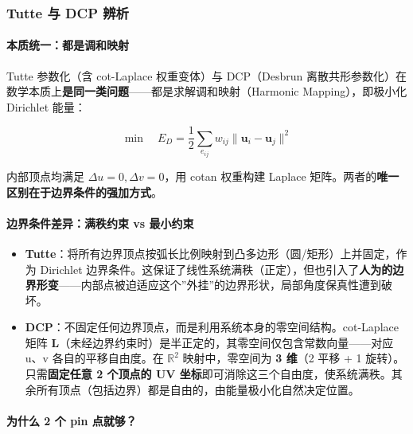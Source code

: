 \documentclass[
]{article}
\begin{document}
\subsubsection{Tutte 与 DCP 辨析}\label{tutte-ux4e0e-dcp-ux8fa8ux6790}

\paragraph{本质统一：都是调和映射}\label{ux672cux8d28ux7edfux4e00ux90fdux662fux8c03ux548cux6620ux5c04}

Tutte 参数化（含 cot-Laplace 权重变体）与 DCP（Desbrun
离散共形参数化）在数学本质上\textbf{是同一类问题}------都是求解调和映射（Harmonic
Mapping），即极小化 Dirichlet 能量：

\[
\min \quad E_D = \frac{1}{2} \sum_{e_{ij}} w_{ij} \|\mathbf{u}_i - \mathbf{u}_j\|^2
\]

内部顶点均满足 \(\Delta u = 0, \Delta v = 0\)，用 cotan 权重构建 Laplace
矩阵。两者的\textbf{唯一区别在于边界条件的强加方式}。

\paragraph{边界条件差异：满秩约束 vs
最小约束}\label{ux8fb9ux754cux6761ux4ef6ux5deeux5f02ux6ee1ux79e9ux7ea6ux675f-vs-ux6700ux5c0fux7ea6ux675f}

\begin{itemize}
\item
  \textbf{Tutte}：将所有边界顶点按弧长比例映射到凸多边形（圆/矩形）上并固定，作为
  Dirichlet
  边界条件。这保证了线性系统满秩（正定），但也引入了\textbf{人为的边界形变}------内部点被迫适应这个''外挂''的边界形状，局部角度保真性遭到破坏。
\item
  \textbf{DCP}：不固定任何边界顶点，而是利用系统本身的零空间结构。cot-Laplace
  矩阵
  \(\mathbf{L}\)（未经边界约束时）是半正定的，其零空间仅包含常数向量------对应
  u、v 各自的平移自由度。在 \(\mathbb{R}^2\) 映射中，零空间为 \textbf{3
  维}（2 平移 + 1 旋转）。只需\textbf{固定任意 2 个顶点的 UV
  坐标}即可消除这三个自由度，使系统满秩。其余所有顶点（包括边界）都是自由的，由能量极小化自然决定位置。
\end{itemize}

\paragraph{为什么 2 个 pin
点就够？}\label{ux4e3aux4ec0ux4e48-2-ux4e2a-pin-ux70b9ux5c31ux591f}
\end{document}
